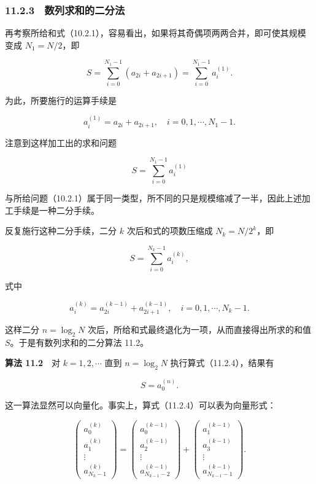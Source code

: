\documentclass[
  10pt,
  fontset=fandol]{ctexart}
\begin{document}
\subsubsection{11.2.3　数列求和的二分法}\label{ux6570ux5217ux6c42ux548cux7684ux4e8cux5206ux6cd5}

再考察所给和式（10.2.1），容易看出，如果将其奇偶项两两合并，即可使其规模变成 \(N_1=N/2\)，即

\[
S=\sum_{i=0}^{N_1-1}(a_{2i}+a_{2i+1})=\sum_{i=0}^{N_1-1}a_i^{(1)}.
\]

为此，所要施行的运算手续是

\[
a_i^{(1)}=a_{2i}+a_{2i+1},\quad i=0,1,\cdots,N_1-1.
\]

注意到这样加工出的求和问题

\[
S=\sum_{i=0}^{N_1-1}a_i^{(1)}
\]

与所给问题（10.2.1）属于同一类型，所不同的只是规模缩减了一半，因此上述加工手续是一种二分手续。

反复施行这种二分手续，二分 \(k\) 次后和式的项数压缩成 \(N_k=N/2^k\)，即

\[
S=\sum_{i=0}^{N_k-1}a_i^{(k)},
\]

式中

\[
a_i^{(k)}=a_{2i}^{(k-1)}+a_{2i+1}^{(k-1)},\quad i=0,1,\cdots,N_k-1.
\tag{11.2.4}
\]

这样二分 \(n=\log_2 N\) 次后，所给和式最终退化为一项，从而直接得出所求的和值 \(S\)。于是有数列求和的二分算法 11.2。

\textbf{算法 11.2}　对 \(k=1,2,\cdots\) 直到 \(n=\log_2 N\) 执行算式（11.2.4），结果有

\[
S=a_0^{(n)}.
\]

这一算法显然可以向量化。事实上，算式（11.2.4）可以表为向量形式：

\[
\begin{pmatrix}
a_0^{(k)}\\
a_1^{(k)}\\
\vdots\\
a_{N_k-1}^{(k)}
\end{pmatrix}
=
\begin{pmatrix}
a_0^{(k-1)}\\
a_2^{(k-1)}\\
\vdots\\
a_{N_{k-1}-2}^{(k-1)}
\end{pmatrix}
+
\begin{pmatrix}
a_1^{(k-1)}\\
a_3^{(k-1)}\\
\vdots\\
a_{N_{k-1}-1}^{(k-1)}
\end{pmatrix}.
\]
\end{document}
